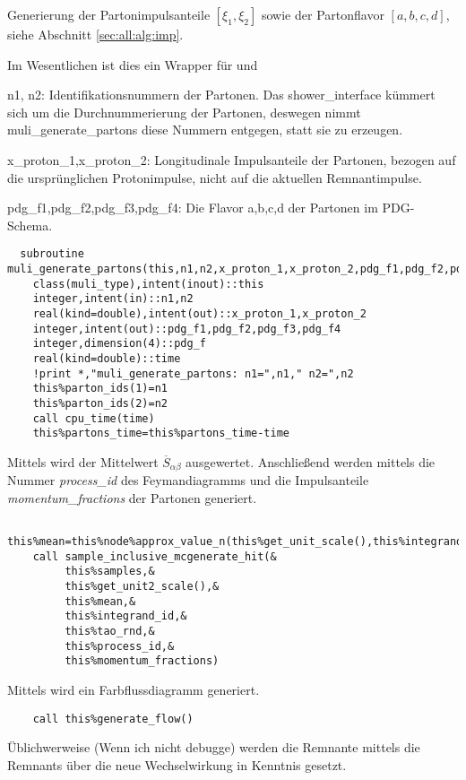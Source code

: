 Generierung der Partonimpulsanteile $[\xi_1, \xi_2]$ sowie der Partonflavor $[a,b,c,d]$, siehe Abschnitt \ref{sec:all:alg:imp}.

Im Wesentlichen ist dies ein Wrapper für  und 

n1, n2: Identifikationsnummern der Partonen. Das shower\_interface kümmert sich um die Durchnummerierung der Partonen, deswegen nimmt muli\_generate\_partons diese Nummern entgegen, statt sie zu erzeugen.

x\_proton\_1,x\_proton\_2: Longitudinale Impulsanteile der Partonen, bezogen auf die ursprünglichen Protonimpulse, nicht auf die aktuellen Remnantimpulse.

pdg\_f1,pdg\_f2,pdg\_f3,pdg\_f4: Die Flavor a,b,c,d der Partonen im PDG-Schema.
\begin{Verbatim}
  subroutine muli_generate_partons(this,n1,n2,x_proton_1,x_proton_2,pdg_f1,pdg_f2,pdg_f3,pdg_f4)
    class(muli_type),intent(inout)::this
    integer,intent(in)::n1,n2
    real(kind=double),intent(out)::x_proton_1,x_proton_2
    integer,intent(out)::pdg_f1,pdg_f2,pdg_f3,pdg_f4
    integer,dimension(4)::pdg_f
    real(kind=double)::time
    !print *,"muli_generate_partons: n1=",n1," n2=",n2
    this%parton_ids(1)=n1
    this%parton_ids(2)=n2
    call cpu_time(time)
    this%partons_time=this%partons_time-time
\end{Verbatim}
Mittels  wird der Mittelwert $\overline{S}_{\alpha\beta}$ ausgewertet. Anschließend werden mittels  die Nummer \emph{process\_id} des Feymandiagramms und die Impulsanteile \emph{momentum\_fractions} der Partonen generiert.
\begin{Verbatim}
    this%mean=this%node%approx_value_n(this%get_unit_scale(),this%integrand_id)
    call sample_inclusive_mcgenerate_hit(&
         this%samples,&
         this%get_unit2_scale(),&
         this%mean,&
         this%integrand_id,&
         this%tao_rnd,&
         this%process_id,&
         this%momentum_fractions)
\end{Verbatim}
Mittels  wird ein Farbflussdiagramm generiert.
\begin{Verbatim}
    call this%generate_flow()
\end{Verbatim}
Üblichwerweise (Wenn ich nicht debugge) werden die Remnante mittels  die Remnants über die neue Wechselwirkung in Kenntnis gesetzt.
